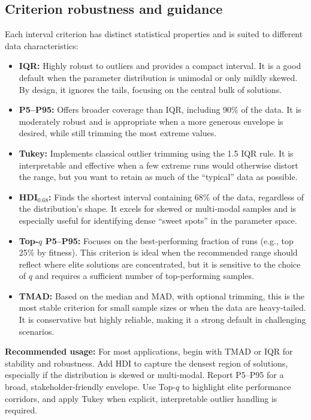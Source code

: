 \documentclass[12pt,a4paper]{article}
\begin{document}
\subsection{Criterion robustness and guidance}
Each interval criterion has distinct statistical properties and is suited to different data characteristics:
\begin{itemize}
    \item \textbf{IQR:} Highly robust to outliers and provides a compact interval. It is a good default when the parameter distribution is unimodal or only mildly skewed. By design, it ignores the tails, focusing on the central bulk of solutions.
    \item \textbf{P5--P95:} Offers broader coverage than IQR, including 90\% of the data. It is moderately robust and is appropriate when a more generous envelope is desired, while still trimming the most extreme values.
    \item \textbf{Tukey:} Implements classical outlier trimming using the 1.5 IQR rule. It is interpretable and effective when a few extreme runs would otherwise distort the range, but you want to retain as much of the “typical” data as possible.
    \item \textbf{HDI$_{0.68}$:} Finds the shortest interval containing 68\% of the data, regardless of the distribution’s shape. It excels for skewed or multi-modal samples and is especially useful for identifying dense “sweet spots” in the parameter space.
    \item \textbf{Top-$q$ P5--P95:} Focuses on the best-performing fraction of runs (e.g., top 25\% by fitness). This criterion is ideal when the recommended range should reflect where elite solutions are concentrated, but it is sensitive to the choice of $q$ and requires a sufficient number of top-performing samples.
    \item \textbf{TMAD:} Based on the median and MAD, with optional trimming, this is the most stable criterion for small sample sizes or when the data are heavy-tailed. It is conservative but highly reliable, making it a strong default in challenging scenarios.
\end{itemize}
\textbf{Recommended usage:} For most applications, begin with TMAD or IQR for stability and robustness. Add HDI to capture the densest region of solutions, especially if the distribution is skewed or multi-modal. Report P5--P95 for a broad, stakeholder-friendly envelope. Use Top-$q$ to highlight elite performance corridors, and apply Tukey when explicit, interpretable outlier handling is required.
\end{document}
